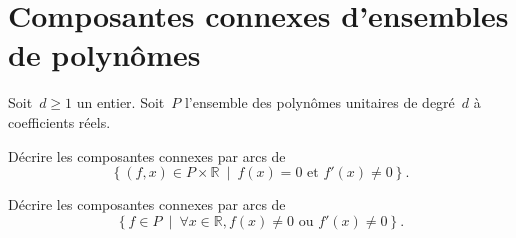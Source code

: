 
\section{Composantes connexes d'ensembles de polynômes}

Soit~$d\geq 1$ un entier.
Soit~$P$ l'ensemble des polynômes unitaires de degré~$d$ à coefficients réels.

Décrire les composantes connexes par arcs de
\[ \left\{ (f, x) \in P \times \mathbb{R} \ \middle|\ f(x) = 0 \text{ et } f'(x) \neq 0 \right\}. \]

Décrire les composantes connexes par arcs de
\[ \left\{ f\in P \ \middle|\ \forall x\in \mathbb{R}, f(x) \neq 0 \text{ ou } f'(x) \neq 0 \right\}. \]

